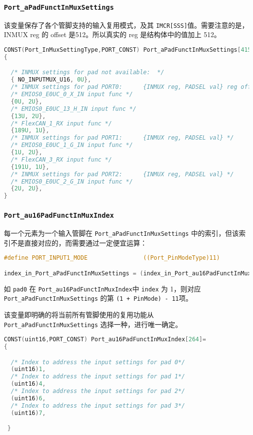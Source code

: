 \subsubsection{\lstinline{Port_aPadFunctInMuxSettings}}
该变量保存了各个管脚支持的输入复用模式，及其 \lstinline{IMCR[SSS]}值。需要注意的是，INMUX reg 的 offset 是512。所以真实的 reg 是结构体中的值加上 512。

\begin{lstlisting}[language=C,style=C]
CONST(Port_InMuxSettingType,PORT_CONST) Port_aPadFunctInMuxSettings[415]=
{

  /* INMUX settings for pad not available:  */
  { NO_INPUTMUX_U16, 0U},
  /* INMUX settings for pad PORT0:      {INMUX reg, PADSEL val} reg offset = 512*/
  /* EMIOS0_E0UC_0_X_IN input func */
  {0U, 2U}, 
  /* EMIOS0_E0UC_13_H_IN input func */
  {13U, 2U}, 
  /* FlexCAN_1_RX input func */
  {189U, 1U}, 
  /* INMUX settings for pad PORT1:      {INMUX reg, PADSEL val} */
  /* EMIOS0_E0UC_1_G_IN input func */
  {1U, 2U}, 
  /* FlexCAN_3_RX input func */
  {191U, 1U}, 
  /* INMUX settings for pad PORT2:      {INMUX reg, PADSEL val} */
  /* EMIOS0_E0UC_2_G_IN input func */
  {2U, 2U}, 
}
\end{lstlisting}

\subsubsection{\lstinline{Port_au16PadFunctInMuxIndex}}

每一个元素为一个输入管脚在 \lstinline{Port_aPadFunctInMuxSettings} 中的索引，但该索引不是直接对应的，而需要通过一定便宜运算：

\begin{lstlisting}[language=C,style=C]
#define PORT_INPUT1_MODE                ((Port_PinModeType)11)

index_in_Port_aPadFunctInMuxSettings = (index_in_Port_au16PadFunctInMuxIndex + PinMode) - PORT_INPUT1_MODE;
\end{lstlisting}

如 \lstinline{pad0} 在 \lstinline{Port_au16PadFunctInMuxIndex}中 \lstinline{index} 为 1，则对应 \lstinline{Port_aPadFunctInMuxSettings} 的第 \lstinline{(1 + PinMode) - 11}项。

该变量即明确的将当前所有管脚使用的复用功能从 \lstinline{Port_aPadFunctInMuxSettings} 选择一种，进行唯一确定。
\begin{lstlisting}[language=C,style=C]
CONST(uint16,PORT_CONST) Port_au16PadFunctInMuxIndex[264]=
{

  /* Index to address the input settings for pad 0*/
  (uint16)1, 
  /* Index to address the input settings for pad 1*/
  (uint16)4, 
  /* Index to address the input settings for pad 2*/
  (uint16)6, 
  /* Index to address the input settings for pad 3*/
  (uint16)7, 

 } 
\end{lstlisting}


